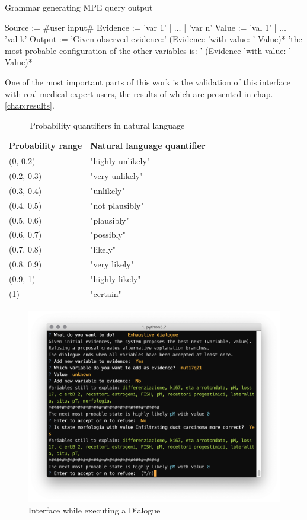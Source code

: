 \begin{algorithm}[htp!]
	\caption{Grammar generating MPE query output}
	\label{alg:nl-mpe}
	\begin{algorithmic}[1]
		\State Source := \#user input\#
		\State Evidence := 'var 1' | $\ldots$ |  'var n'
		\State Value := 'val 1' | $\ldots$ |  'val k'
		\State Output := 'Given observed evidence:' (Evidence 'with value: ' Value)* 'the most probable configuration of the other variables is: ' (Evidence 'with value: ' Value)*
	\end{algorithmic}
\end{algorithm}

One of the most important parts of this work is the validation of this interface with real medical expert users, the results of which are presented in chap. \ref{chap:results}.

\begin{table}[htbp]
\centering
\caption{Probability quantifiers in natural language}
\begin{tabularx}{\textwidth/2}{ X X }
\toprule 
Probability range & Natural language quantifier \\
\midrule 
(0, 0.2) &  "highly unlikely" \\
(0.2, 0.3) & "very unlikely" \\
(0.3, 0.4) & "unlikely" \\
(0.4, 0.5) & "not plausibly" \\
(0.5, 0.6) & "plausibly" \\
(0.6, 0.7) & "possibly" \\
(0.7, 0.8) & "likely" \\
(0.8, 0.9) & "very likely" \\
(0.9, 1) &  "highly likely" \\
(1) &  "certain" \\
\bottomrule
\end{tabularx}
\label{tab:naturallanguageprobabilities}
\end{table}

\begin{figure}[htbp]
\centerline{\includegraphics[width=\columnwidth]{methodology/images/nl-dialogue}}
\caption{Interface while executing a Dialogue}
\label{fig:nl-dialogue}
\end{figure}

